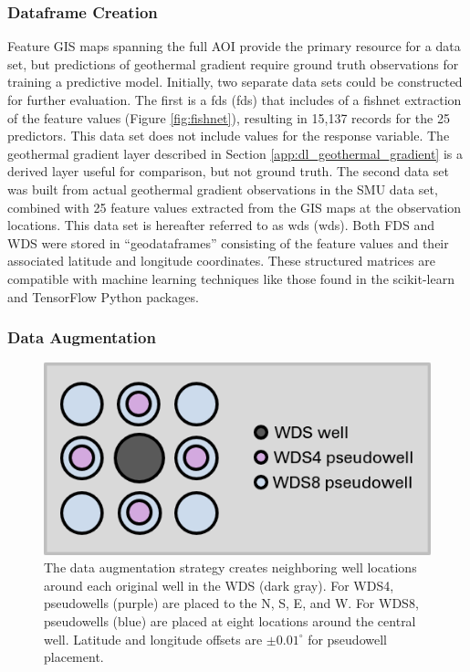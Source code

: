 \subsubsection{Dataframe Creation}
Feature GIS maps spanning the full AOI provide the primary resource for a data set, but predictions of geothermal gradient require ground truth observations for training a predictive model. Initially, two separate data sets could be constructed for further evaluation. The first is a \acrlong{fds} (\acrshort{fds}) that includes of a fishnet extraction of the feature values (Figure \ref{fig:fishnet}), resulting in 15,137 records for the 25 predictors. This data set does not include values for the response variable. The geothermal gradient layer described in Section \ref{app:dl_geothermal_gradient} is a derived layer useful for comparison, but not ground truth. The second data set was built from actual geothermal gradient observations in the SMU data set, combined with 25 feature values extracted from the GIS maps at the observation locations. This data set is hereafter referred to as \acrlong{wds} (\acrshort{wds}). Both FDS and WDS were stored in ``geodataframes'' consisting of the feature values and their associated latitude and longitude coordinates. These structured matrices are compatible with machine learning techniques like those found in the scikit-learn \citep{pedregosa_scikit-learn_2011} and TensorFlow \citep{abadi_tensorflow_2016} Python packages. 

\subsubsection{Data Augmentation}
\label{ch3:augmentation}

\begin{figure}
\centering
\includegraphics[scale=0.9]{templates/images/Figure-AugmentedWells.png}
\singlespacing
\caption[Data augmentation strategy]{The data augmentation strategy creates neighboring well locations around each original well in the WDS (dark gray). For WDS4, pseudowells (purple) are placed to the N, S, E, and W. For WDS8, pseudowells (blue) are placed at eight locations around the central well. Latitude and longitude offsets are $\pm0.01^\circ$ for pseudowell placement.}
\label{fig:data_augmentation}
\end{figure}

